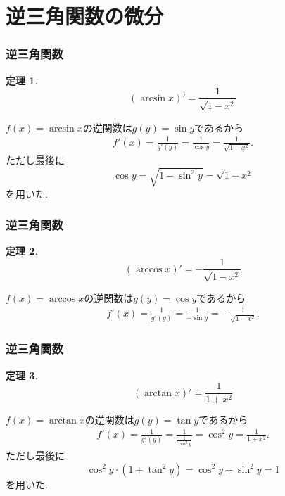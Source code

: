 \documentclass[dvipdfmx,cjk,10.2pt]{beamer}
\theoremstyle{definition}
\newtheorem{Thm}{定理}[section]
\begin{document}
\section{逆三角関数の微分}

\begin{frame}
\frametitle{逆三角関数}

\begin{Thm}
$$
(\arcsin x)'=\frac{1}{\sqrt{1-x^2}}
$$
\end{Thm}

$f(x)=\arcsin x$の逆関数は$g(y)=\sin y$であるから
\begin{align*}
f'(x)=\frac{1}{g'(y)}=\frac{1}{\cos y}=\frac{1}{\sqrt{1-x^2}}. 
\end{align*}
ただし最後に
$$
\cos y = \sqrt{1-\sin^2 y}=\sqrt{1-x^2}
$$
を用いた. 


\end{frame}





\begin{frame}
\frametitle{逆三角関数}

\begin{Thm}
$$
(\arccos x)'= - \frac{1}{\sqrt{1-x^2}}
$$
\end{Thm}

$f(x)=\arccos x$の逆関数は$g(y)=\cos y$であるから
\begin{align*}
f'(x)=\frac{1}{g'(y)}=\frac{1}{- \sin y}=-\frac{1}{\sqrt{1-x^2}}. 
\end{align*}
\end{frame}




\begin{frame}
\frametitle{逆三角関数}

\begin{Thm}
$$
(\arctan x)'= \frac{1}{1+x^2}
$$
\end{Thm}

$f(x)=\arctan x$の逆関数は$g(y)=\tan y$であるから
\begin{align*}
f'(x)=\frac{1}{g'(y)}=\frac{1}{\frac{1}{\cos^2 y}}=\cos^2 y = \frac{1}{1+x^2}.  
\end{align*}
ただし最後に
$$
\cos^2 y \cdot (1+\tan^2 y)=\cos^2 y + \sin^2 y = 1
$$
を用いた. 

\end{frame}
\end{document}
